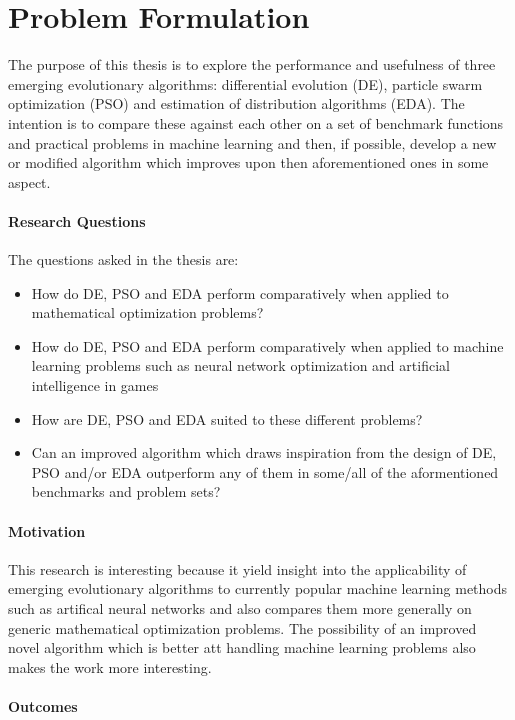 \section{Problem Formulation}

The purpose of this thesis is to explore the performance and usefulness of three emerging evolutionary algorithms: differential evolution (DE), particle swarm optimization (PSO) and estimation of distribution algorithms (EDA). The intention is to compare these against each other on a set of benchmark functions and practical problems in machine learning and then, if possible, develop a new or modified algorithm which improves upon then aforementioned ones in some aspect.

\paragraph{Research Questions}

The questions asked in the thesis are:
\begin{itemize}
  \item How do DE, PSO and EDA perform comparatively when applied to mathematical optimization problems?
  \item How do DE, PSO and EDA perform comparatively when applied to machine learning problems such as neural network optimization and artificial intelligence in games
  \item How are DE, PSO and EDA suited to these different problems?
  \item Can an improved algorithm which draws inspiration from the design of DE, PSO and/or EDA outperform any of them in some/all of the aformentioned benchmarks and problem sets?
\end{itemize}

\paragraph{Motivation}

This research is interesting because it yield insight into the applicability of emerging evolutionary algorithms to currently popular machine learning methods such as artifical neural networks and also compares them more generally on generic mathematical optimization problems. The possibility of an improved novel algorithm which is better att handling machine learning problems also makes the work more interesting.

\paragraph{Outcomes}

